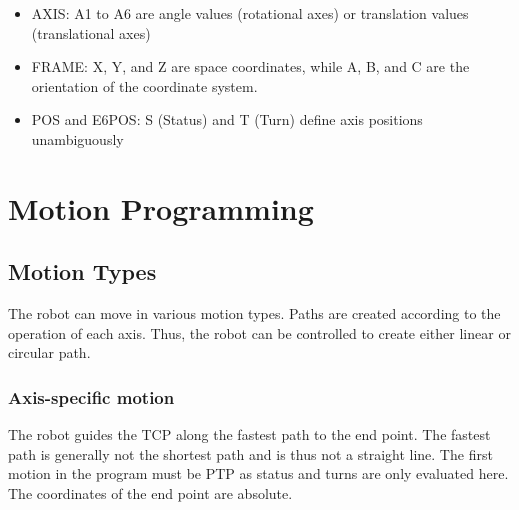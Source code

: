 \documentclass[a4paper]{report}
\begin{document}
\begin{itemize}

	\item AXIS: A1 to A6 are angle values (rotational axes) or translation values (translational axes)
		\vspace{.2cm}
		\newline
\vspace{.2cm}
	\item FRAME: X, Y, and Z are space coordinates, while A, B, and C are the orientation of the coordinate system.
		\vspace{.02cm}
	\newline

\newline

\item POS and E6POS:  S (Status) and T (Turn) define axis positions unambiguously
\vspace{.2cm}
\newline
\end{itemize}

\vspace{0.05cm}

	\section{Motion Programming}
\subsection{Motion Types}
The robot can move in various motion types. Paths are created according to the operation of each axis. Thus, the robot can be controlled to create either linear or circular path.
\subsubsection{Axis-specific motion}
	   The robot guides the TCP along the fastest path to the end point. The fastest path is generally not the shortest path and is thus not a straight line. The first motion in the program must be PTP as status and turns are only evaluated here.
	   The coordinates of the end point are absolute.
\end{document}
